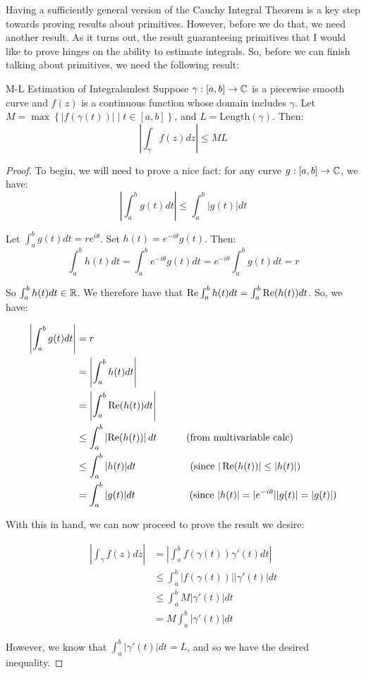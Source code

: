 Having a sufficiently general version of the Cauchy Integral Theorem is a key step towards proving results about primitives. However, before we do that, we need another result. As it turns out, the result guaranteeing primitives that I would like to prove hinges on the ability to estimate integrals. So, before we can finish talking about primitives, we need the following result:

\begin{thmbo}{M-L Estimation of Integrals}{mlest} Suppose $\gamma:[a,b]\rightarrow \mathbb{C}$ is a piecewise smooth curve and $f(z)$ is a continuous function whose domain includes $\gamma$. Let $M = \max\left\{|f(\gamma(t))|\middle|t\in[a,b]\right\}$, and $L = \mathrm{Length}(\gamma)$. Then:
$$\left|\int_{\gamma}f(z)dz\right| \le ML$$
\end{thmbo}

\begin{proof} To begin, we will need to prove a nice fact: for any curve $g:[a,b]\rightarrow \mathbb{C}$, we have:
$$\left|\int_a^b g(t)dt\right| \le \int_a^b|g(t)|dt$$

Let $\int_a^bg(t)dt = re^{i\theta}$. Set $h(t) = e^{-i\theta}g(t)$. Then:
$$\int_a^bh(t)dt = \int_a^b e^{-i\theta}g(t)dt = e^{-i\theta}\int_a^bg(t)dt = r$$

So $\int_a^bh(t)dt \in \mathbb{R}$. We therefore have that $\operatorname{Re}\int_a^bh(t)dt = \int_a^b\operatorname{Re}(h(t))dt$. So, we have:

\begin{align*}\left|\int_a^bg(t)dt\right| &= r\\
&= \left|\int_a^b h(t)dt\right|\\
&= \left|\int_a^b \operatorname{Re}(h(t))dt\right|\\
&\le \int_a^b \left|\operatorname{Re}(h(t))\right|dt \hspace{30pt} (\text{from multivariable calc})\\
&\le \int_a^b |h(t)|dt \hspace{55pt} (\text{since }|\operatorname{Re}(h(t))| \le |h(t)|)\\
&= \int_a^b |g(t)|dt \hspace{55pt} (\text{since } |h(t)| = |e^{-i\theta}||g(t)| = |g(t)|)
\end{align*}


With this in hand, we can now proceed to prove the result we desire:

\begin{align*} \left|\int_{\gamma} f(z)dz\right| &= \left|\int_a^b f(\gamma(t))\gamma'(t)dt\right|\\
&\le \int_a^b |f(\gamma(t))||\gamma'(t)|dt\\
&\le \int_a^b M|\gamma'(t)|dt\\
&= M\int_a^b |\gamma'(t)|dt
\end{align*}

However, we know that $\int_a^b |\gamma'(t)|dt = L$, and so we have the desired inequality.
\end{proof}

